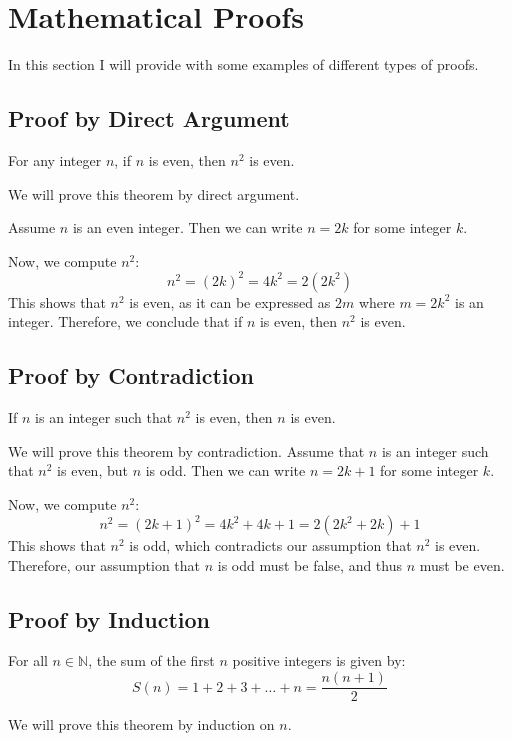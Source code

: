 \section{Mathematical Proofs}
In this section I will provide with some examples of different types of proofs.
\subsection{Proof by Direct Argument}

For any integer \( n \), if \( n \) is even, then \( n^2 \) is even.

	We will prove this theorem by direct argument.

	Assume \( n \) is an even integer. Then we can write \( n = 2k \) for some integer \( k \).

	Now, we compute \( n^2 \):
	\[
		n^2 = (2k)^2 = 4k^2 = 2(2k^2)
	\]
	This shows that \( n^2 \) is even, as it can be expressed as \( 2m \) where \( m = 2k^2 \) is an integer.
	Therefore, we conclude that if \( n \) is even, then \( n^2 \) is even.


\QED

\subsection{Proof by Contradiction}

If \( n \) is an integer such that \( n^2 \) is even, then \( n \) is even.


	We will prove this theorem by contradiction. Assume that \( n \) is an integer such that \( n^2 \) is even, but \( n \) is odd. Then we can write \( n = 2k + 1 \) for some integer \( k \).

	Now, we compute \( n^2 \):
	\[
		n^2 = (2k + 1)^2 = 4k^2 + 4k + 1 = 2(2k^2 + 2k) + 1
	\]
	This shows that \( n^2 \) is odd, which contradicts our assumption that \( n^2 \) is even. Therefore, our assumption that \( n \) is odd must be false, and thus \( n \) must be even.

\QED

\subsection{Proof by Induction}

For all \( n \in \mathbb{N} \), the sum of the first \( n \) positive integers is given by:
\[
	S(n) = 1 + 2 + 3 + \ldots + n = \frac{n(n+1)}{2}
\]


	We will prove this theorem by induction on \( n \).

